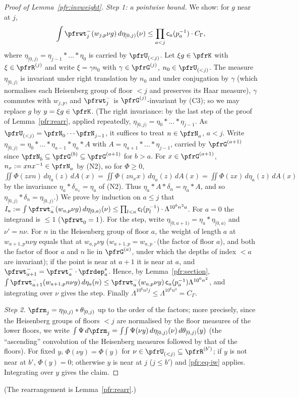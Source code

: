 \documentclass[10pt]{amsart}
\theoremstyle{definition}
\theoremstyle{remark}
\begin{document}
\begin{proof}[Proof of Lemma~\ref{pfr:invweight}]
\emph{Step 1: a pointwise bound.} We show: for $g$ near at $j$,
\begin{equation}\label{pfr:eq-iw}
\int\pfrwt^-_j(w_{j,p}\nu g)\,d\eta_{[0,j)}(\nu)\le\prod_{a<j}\mathsf c_a(p_a^{-1})\cdot C_\Gamma,
\end{equation}
where $\eta_{[0,j)}=\eta_{j-1}*\dots*\eta_0$ is carried by $\pfrU_{(<j)}$. Let $\xi g\in\pfrK$ with
$\xi\in\pfrR^{(j)}$ and write $\xi=\gamma n_0$ with $\gamma\in\pfrG^{(j)}$, $n_0\in\pfrU_{(<j)}$. The measure
$\eta_{[0,j)}$ is invariant under right translation by $n_0$ and under conjugation by $\gamma$ (which
normalises each Heisenberg group of floor $<j$ and preserves its Haar measure), $\gamma$ commutes with
$w_{j,p}$, and $\pfrwt^-_j$ is $\pfrG^{(j)}$-invariant by (C3); so we may replace $g$ by $y=\xi g\in\pfrK$. (The right
invariance: by the last step of the proof of Lemma~\ref{pfr:rearr}, applied repeatedly, $\eta_{[0,j)}=
\eta_0*\dots*\eta_{j-1}$. As $\pfrU_{(<j)}=\pfrN_0\cdots\pfrN_{j-1}$, it suffices to treat $n\in\pfrN_a$, $a<j$.
Write $\eta_{[0,j)}=\eta_0*\dots*\eta_{a-1}*\eta_a*A$ with $A=\eta_{a+1}*\dots*\eta_{j-1}$, carried by
$\pfrG^{(a+1)}$ since $\pfrN_b\subseteq\pfrG^{(b)}\subseteq\pfrG^{(a+1)}$ for $b>a$. For $x\in\pfrG^{(a+1)}$,
$n_x:=xnx^{-1}\in\pfrN_a$ by (N2), so for $\Phi\ge0$, $\iint\Phi(zxn)\,d\eta_a(z)\,dA(x)=\iint\Phi(zn_xx)\,d\eta_a(z)\,dA(x)
=\iint\Phi(zx)\,d\eta_a(z)\,dA(x)$ by the invariance $\eta_a*\delta_{n_x}=\eta_a$ of (N2). Thus
$\eta_a*A*\delta_n=\eta_a*A$, and so $\eta_{[0,j)}*\delta_n=\eta_{[0,j)}$.) We
prove by induction on $a\le j$ that $I_a:=\int\pfrwt^-_a(w_{a,p}\nu y)\,d\eta_{[0,a)}(\nu)\le\prod_{l<a}\mathsf
c_l(p_l^{-1})\cdot\Lambda^{10^6n^2a}$. For $a=0$ the integrand is $\le1$ ($\pfrwt_0=1$). For the step, write
$\eta_{[0,a+1)}=\eta_a*\eta_{[0,a)}$ and $\nu'=n\nu$. For $n$ in the Heisenberg group of floor $a$, the
weight of length $a$ at $w_{a+1,p}n\nu y$ equals that at $w_{a,p}\nu y$ ($w_{a+1,p}=w_{a,p}\cdot$(the factor of
floor $a$), and both the factor of floor $a$ and $n$ lie in $\pfrG^{(a)}$, under which the depths of index
$<a$ are invariant); if the point is near at $a+1$ it is near at $a$, and
$\pfrwt^-_{a+1}=\pfrwt^-_a\cdot\pfrdep_a^{s}$. Hence, by Lemma~\ref{pfr:section},
$\int\pfrwt^-_{a+1}(w_{a+1,p}n\nu y)\,d\eta_a(n)\le\pfrwt^-_a(w_{a,p}\nu y)\,\mathsf c_a(p_a^{-1})\Lambda^{10^6n^2}$, and
integrating over $\nu$ gives the step. Finally $\Lambda^{10^6n^2j}\le\Lambda^{10^6n^3}=C_\Gamma$.

\emph{Step 2.} $\pfrm_j=\eta_{[0,j)}*\theta_{[0,j)}$ up to the order of the factors; more precisely, since the
Heisenberg groups of floors $<j$ are normalised by the floor measures of the lower floors, we
write $\int\Psi\,d\pfrm_j=\int\!\int\Psi(\nu y)\,d\eta_{[0,j)}(\nu)\,d\theta_{[0,j)}(y)$ (the ``ascending''
convolution of the Heisenberg measures followed by that of the floors). For fixed $y$,
$\Phi(\nu y)=\Phi(y)$ for $\nu\in\pfrU_{(<j)}\subseteq\pfrR^{(b')}$; if $y$ is not near at $b'$, $\Phi(y)=0$;
otherwise $y$ is near at $j$ ($j\le b'$) and \eqref{pfr:eq-iw} applies. Integrating over $y$ gives the claim.
\end{proof}
(The rearrangement is Lemma~\ref{pfr:rearr}.)
\end{document}
